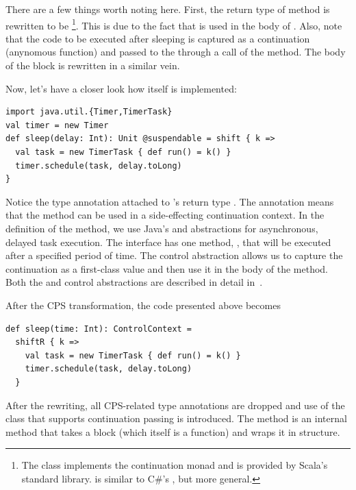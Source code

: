 \documentclass[runningheads,a4paper]{llncs}
\begin{document}
There are a few things worth noting here. First, the return type of  method is rewritten to be \footnote{The  class implements the continuation monad and is provided by Scala's standard library.  is similar to C\#'s , but more general.}. This is due to the fact that  is used in the body of . Also, note that the code to be executed after sleeping is captured as a continuation (anynomous function) and passed to the  through a call of the  method. The body of the  block is rewritten in a similar vein.

Now, let's have a closer look how  itself is implemented:

\begin{lstlisting}[label=code:cps_scala]
import java.util.{Timer,TimerTask}
val timer = new Timer
def sleep(delay: Int): Unit @suspendable = shift { k =>
  val task = new TimerTask { def run() = k() }
  timer.schedule(task, delay.toLong)
}
\end{lstlisting}

Notice the  type annotation attached to 's return type . The  annotation means that the  method can be used in a side-effecting continuation context. In the definition of the  method, we use Java's  and  abstractions for asynchronous, delayed task execution. The  interface has one method, , that will be executed after a specified period of time. The  control abstraction allows us to capture the continuation as a first-class value and then use it in the body of the  method. Both the  and  control abstractions are described in detail in~\cite{danvy90}.

After the CPS transformation, the code presented above becomes
\begin{lstlisting}
def sleep(time: Int): ControlContext =
  shiftR { k =>
    val task = new TimerTask { def run() = k() }
    timer.schedule(task, delay.toLong)
  }
\end{lstlisting}

After the rewriting, all CPS-related type annotations are dropped and use of the  class that supports continuation passing is introduced. The  method is an internal method that takes a block (which itself is a function) and wraps it in  structure.
\end{document}
